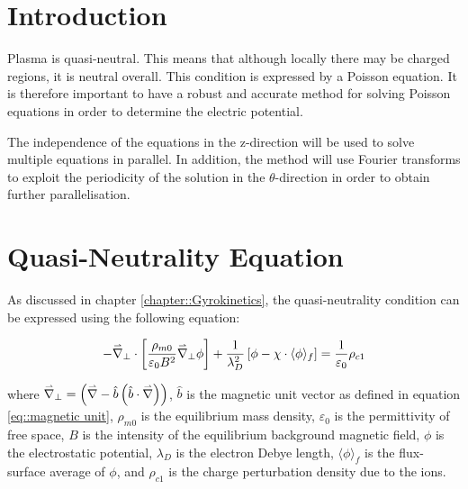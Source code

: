 
\section{Introduction}

Plasma is quasi-neutral. This means that although locally there may be charged regions, it is neutral overall. This condition is expressed by a Poisson equation. It is therefore important to have a robust and accurate method for solving Poisson equations in order to determine the electric potential.

The independence of the equations in the z-direction will be used to solve multiple equations in parallel. In addition, the method will use Fourier transforms to exploit the periodicity of the solution in the $\theta$-direction in order to obtain further parallelisation.

\section{Quasi-Neutrality Equation}


As discussed in chapter \ref{chapter::Gyrokinetics}, the quasi-neutrality condition can be expressed using the following equation:

\begin{equation}\label{eq::quasi neutrality start}
 -\accentset{\rightharpoonup}{\nabla}_\perp\cdot\left[\frac{\rho_{m0}}{\varepsilon_0B^2}\accentset{\rightharpoonup}{\nabla}_\perp\phi\right]+\frac{1}{\lambda_D^2}\left[\phi-\chi\cdot\langle\phi\rangle_f\right]=\frac{1}{\varepsilon_0}\rho_{c1}
\end{equation}

where $\accentset{\rightharpoonup}{\nabla}_\perp = \left(\accentset{\rightharpoonup}{\nabla}-\hat{b}\left(\hat{b}\cdot\accentset{\rightharpoonup}{\nabla}\right)\right)$, $\hat{b}$ is the magnetic unit vector as defined in equation \ref{eq::magnetic unit}, $\rho_{m0}$ is the equilibrium mass density, $\varepsilon_0$ is the permittivity of free space, $B$ is the intensity of the equilibrium background magnetic field, $\phi$ is the electrostatic potential, $\lambda_D$ is the electron Debye length, $\langle\phi\rangle_f$ is the flux-surface average of $\phi$, and $\rho_{c1}$ is the charge perturbation density due to the ions.

